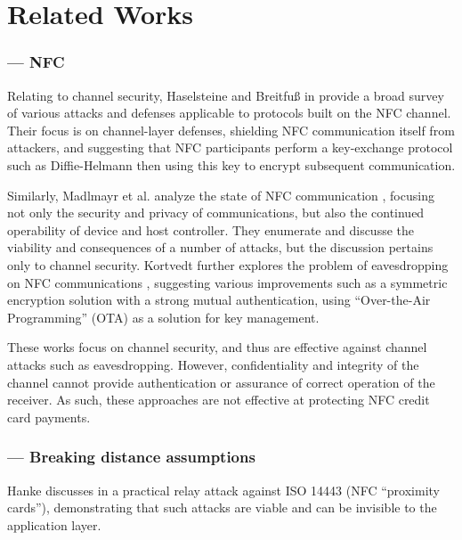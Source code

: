 \section{Related Works}
\label{sec:related}


\subsubsection*{--- NFC}

Relating to channel security, Haselsteine and Breitfu{\ss} in \cite{haselsteiner2006security} provide a broad survey
    of various attacks and defenses applicable to protocols built on the NFC channel.
Their focus is on channel-layer defenses, shielding NFC communication itself from attackers,
    and suggesting that NFC participants perform a key-exchange protocol such as Diffie-Helmann \cite{diffiehellman}
    then using this key to encrypt subsequent communication.

Similarly, Madlmayr et al. analyze the state of NFC communication \cite{madlmayr2008nfc},
    focusing not only the security and privacy of communications, but also the continued operability of device and host controller.
They enumerate and discusse the viability and consequences of a number of attacks, but the discussion pertains only to channel security.
Kortvedt further explores the problem of eavesdropping on NFC communications \cite{kortvedt2009securing},
    suggesting various improvements such as a symmetric encryption solution with a strong mutual authentication,
    using ``Over-the-Air Programming'' (OTA) as a solution for key management.

These works \cite{haselsteiner2006security, kortvedt2009securing, madlmayr2008nfc} focus on channel security,
    and thus are effective against channel attacks such as eavesdropping.
However, confidentiality and integrity of the channel cannot provide authentication or assurance of correct operation of the receiver.
As such, these approaches are not effective at protecting NFC credit card payments.

\subsubsection*{--- Breaking distance assumptions}

Hanke discusses in \cite{hancke2005practical} a practical relay attack against ISO 14443 (NFC ``proximity cards''),
    demonstrating that such attacks are viable and can be invisible to the application layer.

